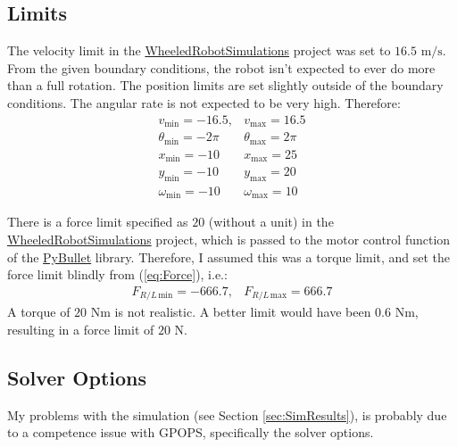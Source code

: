 \documentclass[12pt]{article}
\numberwithin{equation}{section} %
\numberwithin{figure}{section} %
\begin{document}
\subsection{Limits}
\label{sec:Limits}

The velocity limit in the {\color{blue} \href{https://github.com/Yurof/WheeledRobotSimulations}{WheeledRobotSimulations}} project was set to $16.5$ $\mathrm{m/s}$. From the given boundary conditions, the robot isn't expected to ever do more than a full rotation. The position limits are set slightly outside of the boundary conditions. The angular rate is not expected to be very high. Therefore:
\begin{equation}
	\begin{matrix}
		v_\mathrm{min} = -16.5, & v_\mathrm{max} = 16.5 \\
		\theta_\mathrm{min} = - 2 \pi & \theta_\mathrm{max} = 2 \pi \\
		x_\mathrm{min} = - 10 & x_\mathrm{max} = 25 \\
		y_\mathrm{min} = - 10 & y_\mathrm{max} = 20 \\
		\omega_\mathrm{min} = - 10 & \omega_\mathrm{max} = 10
	\end{matrix} \nonumber
\end{equation}

There is a force limit specified as $20$ (without a unit) in the {\color{blue} \href{https://github.com/Yurof/WheeledRobotSimulations}{WheeledRobotSimulations}} project, which is passed to the motor control function of the {\color{blue} \href{https://github.com/bulletphysics/bullet3}{PyBullet}} library. Therefore, I assumed this was a torque limit, and set the force limit blindly from (\ref{eq:Force}), i.e.:
\begin{equation}
	\begin{matrix}
		F_{R/L \, \mathrm{min}} = -666.7, & F_{R/L \, \mathrm{max}} = 666.7
	\end{matrix} \nonumber
\end{equation}
A torque of $20$ $\mathrm{Nm}$ is not realistic. A better limit would have been $0.6$ $\mathrm{Nm}$, resulting in a force limit of $20$ N.

\subsection{Solver Options}

My problems with the simulation (see Section \ref{sec:SimResults}), is probably due to a competence issue with GPOPS, specifically the solver options.
\end{document}

